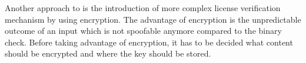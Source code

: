 Another approach to is the introduction of more complex license verification mechanism by using encryption.
The advantage of encryption is the unpredictable outcome of an input which is not spoofable anymore compared to the binary check.
Before taking advantage of encryption, it has to be decided what content should be encrypted and where the key should be stored.
